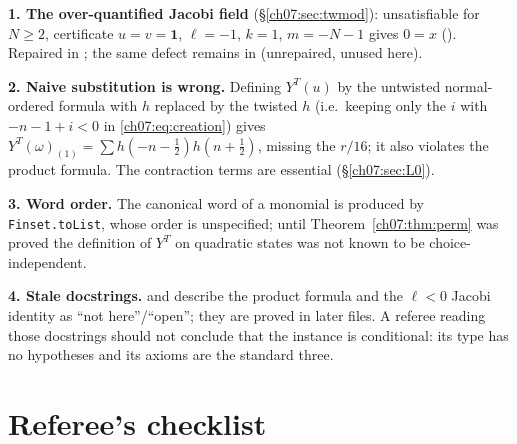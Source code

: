 \begin{warning}
\textbf{1. The over-quantified Jacobi field} (\S\ref{ch07:sec:twmod}): unsatisfiable for $N\ge2$,
certificate $u=v=\mathbf 1$, $\ell=-1$, $k=1$, $m=-N-1$ gives $0 = x$
(). Repaired in ; the same
defect remains in  (unrepaired, unused here).

\textbf{2. Naive substitution is wrong.} Defining $Y^T(u)$ by the untwisted normal-ordered
formula with $h$ replaced by the twisted $h$ (i.e.\ keeping only the $i$ with $-n-1+i<0$ in
\eqref{ch07:eq:creation}) gives $Y^T(\omega)_{(1)} = \sum h(-n-\frac12)h(n+\frac12)$, missing the
$r/16$; it also violates the product formula. The contraction terms are essential
(\S\ref{ch07:sec:L0}).

\textbf{3. Word order.} The canonical word of a monomial is produced by \verb|Finset.toList|,
whose order is unspecified; until Theorem~\ref{ch07:thm:perm} was proved the definition of $Y^T$
on quadratic states was not known to be choice-independent.

\textbf{4. Stale docstrings.}  and
 describe the product formula and the
$\ell<0$ Jacobi identity as ``not here''/``open''; they are proved in later files. A referee
reading those docstrings should not conclude that the instance is conditional: its type has no
hypotheses and its axioms are the standard three.
\end{warning}

\section{Referee's checklist}\label{ch07:sec:checklist}

